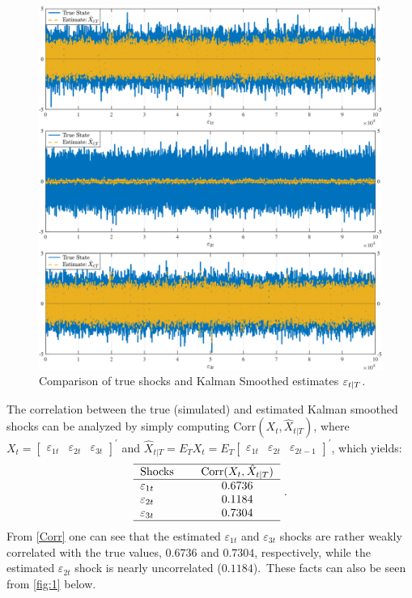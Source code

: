 \documentclass[a4paper,final,12pt]{article}
\begin{document}
\begin{figure}[h!]
\centering
\includegraphics[width=1\textwidth,trim={0 0 0
0},clip,angle=00]{Clark87_plots_KS.pdf}
\caption{Comparison of true shocks and Kalman Smoothed estimates $\protect%
\varepsilon _{t|T}$.}
\label{fig:1}
\end{figure}
The correlation between the true (simulated) and estimated Kalman smoothed
shocks can be analyzed by simply computing $\mathrm{Corr}(X_{t},\hat{X}%
_{t|T})$, where $X_{t}=%
\begin{bmatrix}
\varepsilon _{1t} & \varepsilon _{2t} & \varepsilon _{3t}%
\end{bmatrix}%
^{\prime }$ and $\hat{X}_{t|T}=E_{T}X_{t}=E_{T}%
\begin{bmatrix}
\varepsilon _{1t} & \varepsilon _{2t} & \varepsilon _{2t-1}%
\end{bmatrix}%
^{\prime }$, which yields:%
\begin{equation}
\begin{tabular}{lcc}
\hline
Shocks &  & $\mathrm{Corr}(X_{t},\hat{X}_{t|T})$ \\ \hline
$\varepsilon _{1t}$ &  & $0.6736$ \\ 
$\varepsilon _{2t}$ &  & $0.1184$ \\ 
$\varepsilon _{3t}$ &  & $0.7304$ \\ \hline
\end{tabular}%
~.  \label{Corr}
\end{equation}%
From \ref{Corr} one can see that the estimated $\varepsilon _{1t}$ and $%
\varepsilon _{3t}$ shocks are rather weakly correlated with the true values, 
$0.6736$ and $0.7304$, respectively, while the estimated $\varepsilon _{2t}$
shock is nearly uncorrelated ($0.1184$).\ These facts can also be seen from %
\autoref{fig:1} below.
\end{document}
